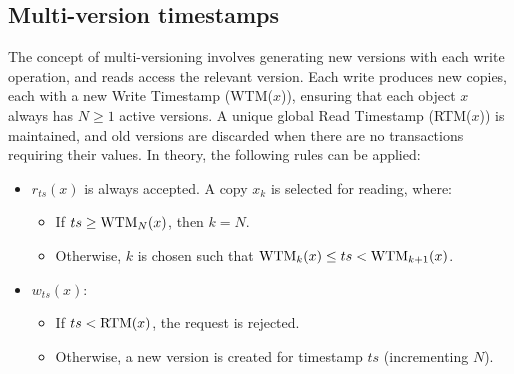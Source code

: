 \subsection{Multi-version timestamps}
The concept of multi-versioning involves generating new versions with each write operation, and reads access the relevant version.
Each write produces new copies, each with a new Write Timestamp (WTM($x$)), ensuring that each object $x$ always has $N \geq 1$ active versions.
A unique global Read Timestamp (RTM($x$)) is maintained, and old versions are discarded when there are no transactions requiring their values.
In theory, the following rules can be applied:
\begin{itemize}
    \item $r_{ts}(x)$ is always accepted. A copy $x_k$ is selected for reading, where:
        \begin{itemize}
            \item If $ts \geq \textnormal{WTM}_N(x)$, then $k=N$.
            \item Otherwise, $k$ is chosen such that $\textnormal{WTM}_k(x) \leq ts < \textnormal{WTM}_{k+1}(x)$. 
        \end{itemize}
    \item $w_{ts}(x)$: 
        \begin{itemize}
            \item If $ts < \textnormal{RTM}(x)$, the request is rejected. 
            \item  Otherwise, a new version is created for timestamp $ts$ (incrementing $N$).
        \end{itemize}
\end{itemize}
